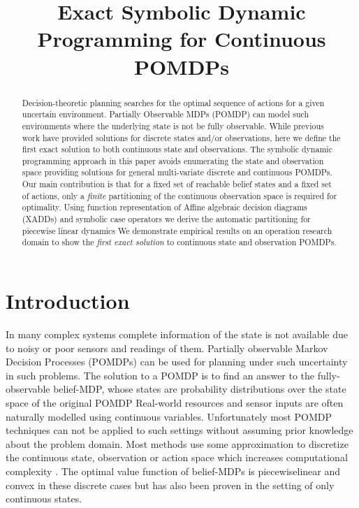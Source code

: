 \documentclass{article} %
\title{Exact Symbolic Dynamic Programming for Continuous POMDPs}
\author{
}
\begin{document}
\maketitle

\begin{abstract}
Decision-theoretic planning searches for the optimal sequence of actions for a given uncertain environment. Partially Observable MDPs (POMDP) can model such environments where the underlying state is not be fully observable. %
While previous work have provided solutions for discrete states and/or observations, here we define the first exact solution to both continuous state and observations. The symbolic dynamic programming approach in this paper avoids enumerating the state and observation space providing solutions for general multi-variate discrete and continuous POMDPs. Our main contribution is that for a fixed set of reachable belief states and a fixed set of actions, only a \textit{finite} partitioning of the continuous observation space is required for optimality. 
Using function representation of Affine algebraic decision diagrams (XADDs) and symbolic case operators we derive the automatic partitioning for piecewise linear dynamics %
We demonstrate empirical results on an operation research domain to show the \textit{first exact solution} to continuous state and observation POMDPs.  
\end{abstract}

\section{Introduction}
In many complex systems complete information of the state is not available due to noisy or poor sensors and readings of them. Partially observable Markov Decision Processes (POMDPs)\cite{POMDPfirst} can be used for planning under such uncertainty in such problems. The solution to a POMDP is to find an answer to the fully-observable belief-MDP, whose states are probability distributions over the state space of the original POMDP \cite{kaebling}
Real-world resources and sensor inputs are often naturally modelled using continuous variables. 
Unfortunately most POMDP techniques can not be applied to such settings without assuming prior knowledge about the problem domain. Most methods use some approximation to discretize the continuous state, observation or action space which increases computational complexity \cite{Thrun99h}. The optimal value function of belief-MDPs is piecewiselinear and convex in these discrete cases \cite{sondik71} but has also been proven in the setting of only continuous states. \cite{PerseusObs}
\end{document}
